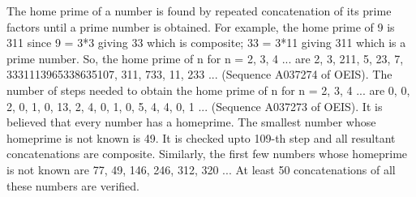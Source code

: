 \documentclass[12pt]{article}
\begin{document}
The home prime of a number is found by repeated concatenation of its prime factors until a prime number is obtained. For example, the home prime of 9 is 311 since 9 = 3*3 giving 33 which is composite; 33 = 3*11 giving 311 which is a prime number. So, the home prime of n for n = 2, 3, 4 ... are 2, 3, 211, 5, 23, 7, 3331113965338635107, 311, 733, 11, 233 ... (Sequence A037274 of OEIS). The number of steps needed to obtain the home prime of n for n = 2, 3, 4 ... are 0, 0, 2, 0, 1, 0, 13, 2, 4, 0, 1, 0, 5, 4, 4, 0, 1 ... (Sequence A037273 of OEIS). It is believed that every number has a homeprime. The smallest number whose homeprime is not known is 49.
It is checked upto 109-th step and all resultant concatenations are composite. Similarly, the first few numbers whose homeprime is not known are 77, 49, 146, 246, 312, 320 ... At least 50 concatenations of all these numbers are verified.
\end{document}
